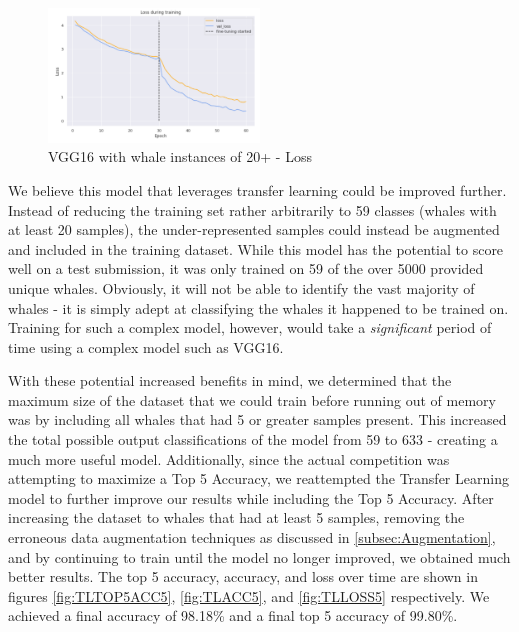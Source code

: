 \documentclass[paper=a4, fontsize=11pt]{scrartcl}
\numberwithin{equation}{section}		%
\numberwithin{table}{section}				%
\begin{document}
\begin{figure}[!h]
    \centering
    \includegraphics[width=0.5\textwidth]{TLloss.png}
    \caption{VGG16 with whale instances of 20+ - Loss}
    \label{fig:TLLOSS}
\end{figure}

We believe this model that leverages transfer learning could be improved further. Instead of reducing the training set rather arbitrarily to 59 classes (whales with at least 20 samples), the under-represented samples could instead be augmented and  included in the training dataset. While this model has the potential to score well on a test submission, it was only trained on 59 of the over 5000 provided unique whales. Obviously, it will not be able to identify the vast majority of whales - it is simply adept at classifying the whales it happened to be trained on. Training for such a complex model, however, would take a \textit{significant} period of time using a complex model such as VGG16.

With these potential increased benefits in mind, we determined that the maximum size of the dataset that we could train before running out of memory was by including all whales that had 5 or greater samples present. This increased the total possible output classifications of the model from 59 to 633 - creating a much more useful model. Additionally, since the actual competition was attempting to maximize a Top 5 Accuracy, we reattempted the Transfer Learning model to further improve our results while including the Top 5 Accuracy. After increasing the dataset to whales that had at least 5 samples, removing the erroneous data augmentation techniques as discussed in \autoref{subsec:Augmentation}, and by continuing to train until the model no longer improved, we obtained much better results. The top 5 accuracy, accuracy, and loss over time are shown in figures \autoref{fig:TLTOP5ACC5}, \autoref{fig:TLACC5}, and \autoref{fig:TLLOSS5} respectively. We achieved a final accuracy of 98.18\% and a final top 5 accuracy of 99.80\%.
\end{document}
